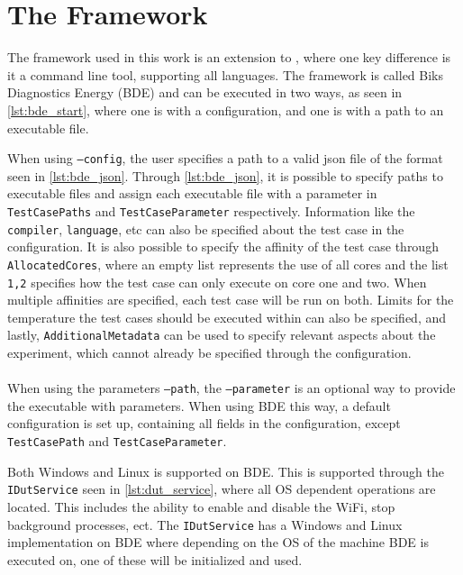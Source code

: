 \section{The Framework}\label{app:framework}

The framework used in this work is an extension to \cite{biksbois}, where one key difference is it a command line tool, supporting all languages. The framework is called Biks Diagnostics Energy (BDE) and can be executed in two ways, as seen in \cref{lst:bde_start}, where one is with a configuration, and one is with a path to an executable file.



When using \texttt{--config}, the user specifies a path to a valid json file of the format seen in \cref{lst:bde_json}. Through \cref{lst:bde_json}, it is possible to specify paths to executable files and assign each executable file with a parameter in \texttt{TestCasePaths} and \texttt{TestCaseParameter} respectively. Information like the \texttt{compiler}, \texttt{language}, etc can also be specified about the test case in the configuration. It is also possible to specify the affinity of the test case through \texttt{AllocatedCores}, where an empty list represents the use of all cores and the list \texttt{1,2} specifies how the test case can only execute on core one and two. When multiple affinities are specified, each test case will be run on both. Limits for the temperature the test cases should be executed within can also be specified, and lastly, \texttt{AdditionalMetadata} can be used to specify relevant aspects about the experiment, which cannot already be specified through the configuration.



\paragraph*{}
When using the parameters \texttt{--path}, the \texttt{--parameter} is an optional way to provide the executable with parameters. When using BDE this way, a default configuration is set up, containing all fields in the configuration, except \texttt{TestCasePath} and \texttt{TestCaseParameter}.
\newpage



Both Windows and Linux is supported on BDE. This is supported through the \texttt{IDutService} seen in \cref{lst:dut_service}, where all OS dependent operations are located. This includes the ability to enable and disable the WiFi, stop background processes, ect. The \texttt{IDutService} has a Windows and Linux implementation on BDE where depending on the OS of the machine BDE is executed on, one of these will be initialized and used.

